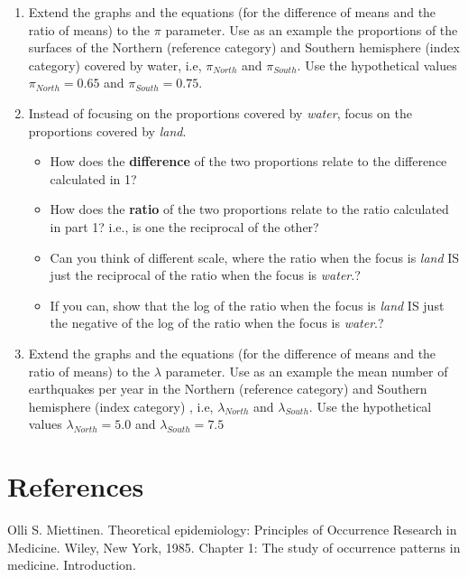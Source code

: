 \documentclass[]{book}
\begin{document}
\begin{enumerate}
\def\labelenumi{\arabic{enumi}.}
\item
  Extend the graphs and the equations (for the difference of means and the ratio of means) to the \(\pi\) parameter. Use as an example the proportions of the surfaces of the Northern (reference category) and Southern hemisphere (index category) covered by water, i.e, \(\pi_{North}\) and \(\pi_{South}.\) Use the hypothetical values \(\pi_{North} = 0.65\) and \(\pi_{South} = 0.75.\)
\item
  Instead of focusing on the proportions covered by \emph{water}, focus on the proportions covered by \emph{land}.

  \begin{itemize}
  \item
    How does the \textbf{difference} of the two proportions relate to the difference calculated in 1?
  \item
    How does the \textbf{ratio} of the two proportions relate to the ratio calculated in part 1? i.e., is one the reciprocal of the other?
  \item
    Can you think of different scale, where the ratio when the focus is \emph{land} IS just the reciprocal of the ratio when the focus is \emph{water}.?
  \item
    If you can, show that the log of the ratio when the focus is \emph{land} IS just the negative of the log of the ratio when the focus is \emph{water}.?
  \end{itemize}
\item
  Extend the graphs and the equations (for the difference of means and the ratio of means) to the \(\lambda\) parameter. Use as an example the mean number of earthquakes per year in the Northern (reference category) and Southern hemisphere (index category) , i.e, \(\lambda_{North}\) and \(\lambda_{South}.\) Use the hypothetical values \(\lambda_{North} = 5.0\) and \(\lambda_{South} = 7.5\)
\end{enumerate}

\hypertarget{references}{%
\section{References}\label{references}}

Olli S. Miettinen. Theoretical epidemiology: Principles of Occurrence Research in Medicine. Wiley, New York, 1985.
Chapter 1: The study of occurrence patterns in medicine. Introduction.
\end{document}
